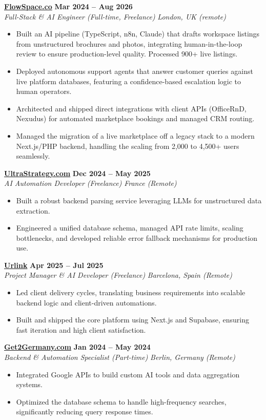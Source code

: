 \documentclass[a4paper,10pt]{article}
\newcommand{\role}[4]{%
 \textbf{#1} \hfill \textbf{#2}\\[1pt]%
 \textit{#3} \hfill \textit{#4}\\[2pt]%
}
\begin{document}
\role{\href{https://flowspace.co}{FlowSpace.co}}{Mar 2024 -- Aug 2026}{Full-Stack \& AI Engineer (Full-time, Freelance)}{London, UK (remote)}
\begin{itemize}
 \item Built an AI pipeline (TypeScript, n8n, Claude) that drafts workspace listings from unstructured brochures and photos, integrating human-in-the-loop review to ensure production-level quality. Processed 900+ live listings.
 \item Deployed autonomous support agents that answer customer queries against live platform databases, featuring a confidence-based escalation logic to human operators.
 \item Architected and shipped direct integrations with client APIs (OfficeRnD, Nexudus) for automated marketplace bookings and managed CRM routing.
 \item Managed the migration of a live marketplace off a legacy stack to a modern Next.js/PHP backend, handling the scaling from 2,000 to 4,500+ users seamlessly.
\end{itemize}

\role{\href{https://ultrastrategy.com}{UltraStrategy.com}}{Dec 2024 -- May 2025}{AI Automation Developer (Freelance)}{France (Remote)}
\begin{itemize}
 \item Built a robust backend parsing service leveraging LLMs for unstructured data extraction.
 \item Engineered a unified database schema, managed API rate limits, scaling bottlenecks, and developed reliable error fallback mechanisms for production use.
\end{itemize}

\role{\href{https://smarturlink.com/}{Urlink}}{Apr 2025 -- Jul 2025}{Project Manager \& AI Developer (Freelance)}{Barcelona, Spain (Remote)}
\begin{itemize}
 \item Led client delivery cycles, translating business requirements into scalable backend logic and client-driven automations.
 \item Built and shipped the core platform using Next.js and Supabase, ensuring fast iteration and high client satisfaction.
\end{itemize}

\role{\href{https://get2germany.com}{Get2Germany.com}}{Jan 2024 -- May 2024}{Backend \& Automation Specialist (Part-time)}{Berlin, Germany (Remote)}
\begin{itemize}
 \item Integrated Google APIs to build custom AI tools and data aggregation systems.
 \item Optimized the database schema to handle high-frequency searches, significantly reducing query response times.
\end{itemize}
\end{document}
